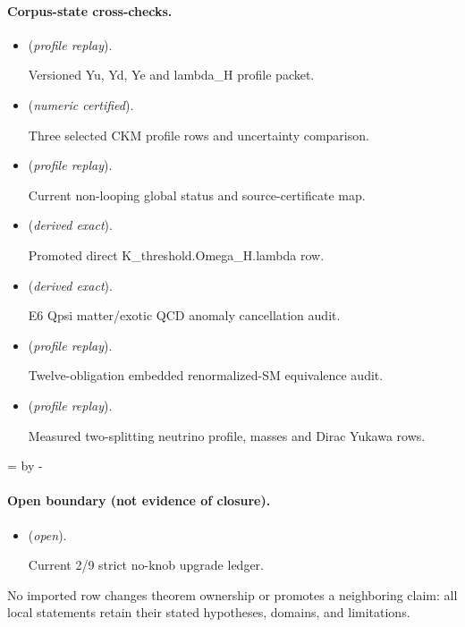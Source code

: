 \documentclass[11pt]{article}
\begin{document}
\paragraph{Corpus-state cross-checks.}
\begin{itemize}
\setlength{\itemsep}{0.25em}
\item {} (\emph{profile replay}).\par Versioned Yu, Yd, Ye and lambda\_H profile packet.
\item {} (\emph{numeric certified}).\par Three selected CKM profile rows and uncertainty comparison.
\item {} (\emph{profile replay}).\par Current non-looping global status and source-certificate map.
\item {} (\emph{derived exact}).\par Promoted direct K\_threshold.Omega\_H.lambda row.
\item {} (\emph{derived exact}).\par E6 Qpsi matter/exotic QCD anomaly cancellation audit.
\item {} (\emph{profile replay}).\par Twelve-obligation embedded renormalized-SM equivalence audit.
\item {} (\emph{profile replay}).\par Measured two-splitting neutrino profile, masses and Dirac Yukawa rows.
\end{itemize}

\par\begingroup{}=\pagegoal\advance{} by -\pagetotal\ifdim\dimen0<7\baselineskip\newpage\fi\endgroup
\paragraph{Open boundary (not evidence of closure).}
\begin{itemize}
\setlength{\itemsep}{0.25em}
\item {} (\emph{open}).\par Current 2/9 strict no-knob upgrade ledger.
\end{itemize}

No imported row changes theorem ownership or promotes a neighboring claim: all local statements retain their stated hypotheses, domains, and limitations.
\end{document}
